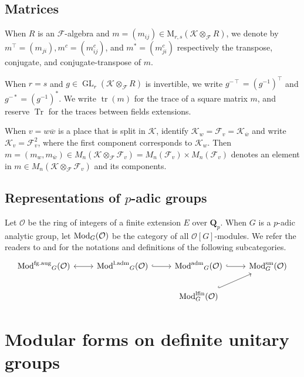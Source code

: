 \documentclass[leqno]{amsart}
\theoremstyle{definition}
\theoremstyle{remark}
\newcommand{\oo}{\mathcal{O}}
\newcommand{\Qp}{\mathbf{Q}_p}
\DeclareMathOperator{\Tr}{Tr}
\DeclareMathOperator{\GL}{GL}
\DeclareMathOperator{\mtr}{tr}
\DeclareMathOperator{\Mod}{\textnormal{Mod}}
\DeclareMathOperator{\laMod}{\textnormal{Mod}^{\textnormal{l.adm}}}
\DeclareMathOperator{\aMod}{\textnormal{Mod}^{\textnormal{adm}}}
\DeclareMathOperator{\fgMod}{\textnormal{Mod}^{\textnormal{fg.aug}}}
\newcommand{\sm}{\textnormal{sm}}
\newcommand{\lfin}{\textnormal{lfin}}
\newcommand{\F}{{\mathcal{F}}} %
\newcommand{\K}{{\mathcal{K}}} %
\newcommand{\bw}{\overline{w}}
\begin{document}
\subsection{Matrices}
When $R$ is an $\F$-algebra and 
$m=(m_{ij})\in \text{M}_{r,s}(\K\otimes_\F R)$,
we denote by 
$m^\intercal=(m_{ji}), 
m^c=(m^c_{ij})$, and
$m^*=(m^c_{ji})$
respectively the transpose, conjugate, and conjugate-transpose of $m$.

When $r=s$ and $g\in \GL_r(\K\otimes_\F R)$ is invertible, we write
$g^{-\intercal}=(g^{-1})^\intercal$ and $g^{-*}=(g^{-1})^*$.
We write $\mtr(m)$ for the trace of a square matrix $m$,
and reserve $\Tr$ for the traces between fields extensions.

When $v=w\bw$ is a place that is split in $\K$,
identify $\K_w=\F_v=\K_{\bw}$ and 
write $\K_v=\F_v^2$, 
where the first component corresponds to $\K_w$.
Then $m=(m_w,m_{\bw})\in M_n(\K\otimes_\F\F_v)=M_n(\F_v)\times M_n(\F_v)$ 
denotes an element in $m\in M_n(\K\otimes_\F\F_v)$ and its components.

\subsection{Representations of $p$-adic groups}

Let $\oo$ be the ring of integers of a finite extension $E$
over  $\Qp$.
When $G$ is a $p$-adic analytic group,
let $\Mod_G(\oo)$ be the category
of all $\oo[G]$-modules.
We refer the readers to \cite[\S 2]{emeI} and \cite[\S 2]{pask}
for the notations and definitions of the following subcategories.
\[
\begin{tikzcd}
	\fgMod_{G}(\oo) \arrow[r,leftrightarrow] &
	\laMod_{G}(\oo) \arrow[r,hookrightarrow] &
	\aMod_{G}(\oo) \arrow[r,hookrightarrow] &
	\Mod^{\sm}_{G}(\oo) \\
					       &&
	\Mod^{\lfin}_{G}(\oo) \arrow[ru,hookrightarrow] &
\end{tikzcd}
\]






\section{Modular forms on definite unitary groups}
\end{document}
